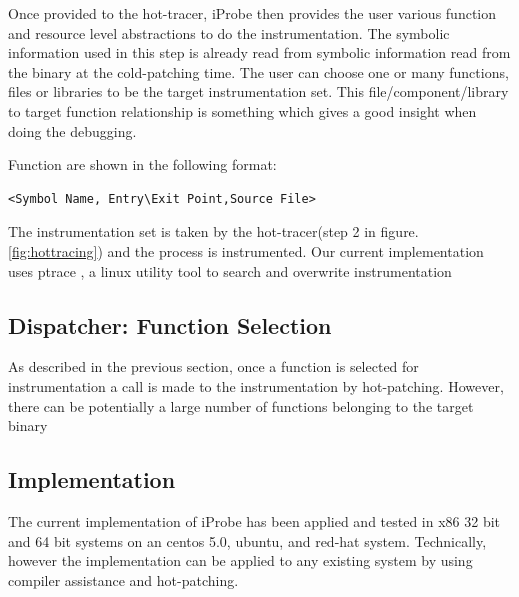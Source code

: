 Once provided to the hot-tracer, iProbe then provides the user various function and resource level abstractions to do the instrumentation. The symbolic information used in this step is already read from symbolic information read from the binary at the cold-patching time. The user can choose one or many functions, files or libraries to be the target instrumentation set. This file/component/library to target function relationship is something which gives a good insight when doing the debugging. 

Function are shown in the following format:
\begin{verbatim}
<Symbol Name, Entry\Exit Point,Source File>
\end{verbatim}

The instrumentation set is taken by the hot-tracer(step 2 in figure.\ref{fig:hottracing}) and the process is instrumented. Our current implementation uses ptrace \cite{ptrace}, a linux utility tool to search and overwrite instrumentation 

\subsection{Dispatcher: Function Selection}

As described in the previous section, once a function is selected for instrumentation a call is made to the instrumentation by hot-patching. However, there can be potentially a large number of functions belonging to the target binary 


\subsection{Implementation}

The current implementation of iProbe has been applied and tested in x86 32 bit and 64 bit systems on an centos 5.0, ubuntu, and red-hat system. Technically, however the implementation can be applied to any existing system by using compiler assistance and hot-patching.

